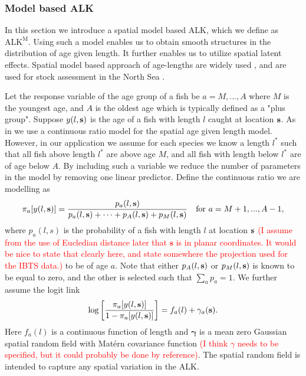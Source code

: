 \documentclass[a4paper 12pt]{article}
\numberwithin{equation}{section}
\newcommand{\ed}[1]{\textcolor{red}{#1}}
\begin{document}
\subsubsection{Model based ALK}
\label{sec:spatialModelALK}
In this section we introduce a spatial model based ALK, which we define as $\mathrm{ALK^M}$. Using such a model enables us to obtain smooth structures in the distribution of age given length. It further enables us to utilize spatial latent effects. Spatial model based approach of age-lengths are widely used \citep{berg2012spatial, hirst2012bayesian, rindorf2001analyses}, and are used for stock assessment in the North Sea \citep{berg2014evaluation}.  %

Let the response variable of the age group of a fish be $a = M,...,A$ where $M$ is the youngest age, and $A$ is the oldest age which is typically defined as a "plus group". Suppose $y(l,{\bf s})$ is the age  of a fish with length $l$ caught at location ${\bf s}$. As in \citet{berg2012spatial} we use a continuous ratio model for the spatial age given length model. However, in our application we assume for each species we know a length $l^*$ such that all fish above length $l^*$ are above age $M$, and all fish with length below $l^*$ are of age below $A$. By including such a variable we reduce the number of parameters in the model by removing one linear predictor. Define the continuous ratio we are modelling as
\begin{equation}\label{eq:linearPred1}
\pi_a[y(l,{\bf s})] = \frac{p_a(l,{\bf s})}{p_a(l,{\bf s}) + \cdots + p_{A}(l,{\bf s}) +p_{M}(l,{\bf s}) } \vspace{ 4mm} \ \ \ \text{for } a =M+1,...,A-1 ,
\end{equation}
where \vspace{-5mm} $p_a(l,s)$ is the probability of a fish with length $l$ at location ${\bf s}$ \ed{(I assume from the use of Eucledian distance later that $\mathbf{s}$ is in planar coordinates. It would be nice to state that clearly here, and state somewhere the projection used for the IBTS data.)} to be of age $a$. Note that either $p_{A}(l,{\bf s})$ or $p_{M}(l,{\bf s})$ is known to be equal to zero, and the other is selected such that $\sum_a p_a = 1$. We further assume the logit link
\begin{equation}\label{eq:linearPred}
\log \left[ \frac{\pi_a[y(l,{\bf s})]}{1-\pi_a[y(l,{\bf s})]}\right] = f_a(l) + \gamma_a({\bf s}).
\end{equation}
Here $ f_a(l)$ is a continuous function of length and $\pmb{\gamma}$ is a mean zero Gaussian spatial random field with Mat\'{e}rn covariance function \ed{(I think $\gamma$ needs to be specified, but it could probably be done by reference)}. The spatial random field is intended to capture any spatial variation in the ALK.
\end{document}

